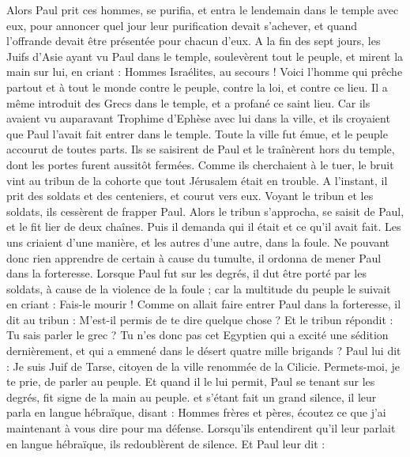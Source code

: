 \begin{multicols}{2}
Alors Paul prit ces hommes, se purifia, et entra le lendemain dans le temple avec eux, pour annoncer quel jour leur purification devait s'achever, et quand l'offrande devait être présentée pour chacun d'eux.
A la fin des sept jours, les Juifs d'Asie ayant vu Paul dans le temple, soulevèrent tout le peuple, et mirent la main sur lui,
en criant : Hommes Israélites, au secours ! Voici l'homme qui prêche partout et à tout le monde contre le peuple, contre la loi, et contre ce lieu. Il a même introduit des Grecs dans le temple, et a profané ce saint lieu.
Car ils avaient vu auparavant Trophime d'Ephèse avec lui dans la ville, et ils croyaient que Paul l'avait fait entrer dans le temple.
Toute la ville fut émue, et le peuple accourut de toutes parts. Ils se saisirent de Paul et le traînèrent hors du temple, dont les portes furent aussitôt fermées.
Comme ils cherchaient à le tuer, le bruit vint au tribun de la cohorte que tout Jérusalem était en trouble.
A l'instant, il prit des soldats et des centeniers, et courut vers eux. Voyant le tribun et les soldats, ils cessèrent de frapper Paul.
Alors le tribun s'approcha, se saisit de Paul, et le fit lier de deux chaînes. Puis il demanda qui il était et ce qu'il avait fait.
Les uns criaient d'une manière, et les autres d'une autre, dans la foule. Ne pouvant donc rien apprendre de certain à cause du tumulte, il ordonna de mener Paul dans la forteresse.
Lorsque Paul fut sur les degrés, il dut être porté par les soldats, à cause de la violence de la foule ;
car la multitude du peuple le suivait en criant : Fais-le mourir !
Comme on allait faire entrer Paul dans la forteresse, il dit au tribun : M'est-il permis de te dire quelque chose ? Et le tribun répondit : Tu sais parler le grec ?
Tu n'es donc pas cet Egyptien qui a excité une sédition dernièrement, et qui a emmené dans le désert quatre mille brigands ?
Paul lui dit : Je suis Juif de Tarse, citoyen de la ville renommée de la Cilicie. Permets-moi, je te prie, de parler au peuple.
Et quand il le lui permit, Paul se tenant sur les degrés, fit signe de la main au peuple. et s'étant fait un grand silence, il leur parla en langue hébraïque, disant :
\VerseOne{}Hommes frères et pères, écoutez ce que j'ai maintenant à vous dire pour ma défense.
Lorsqu'ils entendirent qu'il leur parlait en langue hébraïque, ils redoublèrent de silence. Et Paul leur dit :

\end{multicols}
